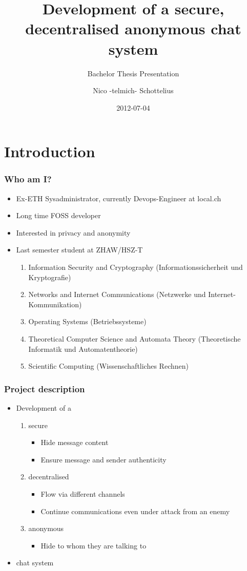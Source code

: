 \documentclass{beamer}
\title{Development of a secure, decentralised anonymous chat system}
\subtitle{Bachelor Thesis Presentation}
\author{Nico -telmich- Schottelius}
\date{2012-07-04}
\begin{document}
\frame{\titlepage}

\frame{\tableofcontents}

\section{Introduction}
\frame
{
  \frametitle{Who am I?}
  \begin{itemize}
  \item Ex-ETH Sysadministrator, currently Devops-Engineer at local.ch
  \item Long time FOSS developer 
  \item Interested in privacy and anonymity
  \item Last semester student at ZHAW/HSZ-T
  \begin{enumerate}
      \item  Information Security and Cryptography (Informationssicherheit und Kryptografie)
      \item  Networks and Internet Communications (Netzwerke und Internet-Kommunikation)
      \item  Operating Systems (Betriebssysteme)
      \item  Theoretical Computer Science and Automata Theory (Theoretische Informatik und Automatentheorie)
      \item  Scientific Computing (Wissenschaftliches Rechnen)
  \end{enumerate}
  \end{itemize}
}

\frame
{
  \frametitle{Project description}
  \begin{itemize}
  \item Development of a
  \begin{enumerate}
      \item  secure
          \begin{itemize}
          \item Hide message content
          \item Ensure message and sender authenticity
          \end{itemize}
      \item  decentralised
          \begin{itemize}
          \item Flow via different channels
          \item Continue communications even under attack from an enemy
          \end{itemize}
      \item  anonymous
          \begin{itemize}
          \item Hide to whom they are talking to
          \end{itemize}
  \end{enumerate}
  \item chat system
  \end{itemize}
}
\end{document}
